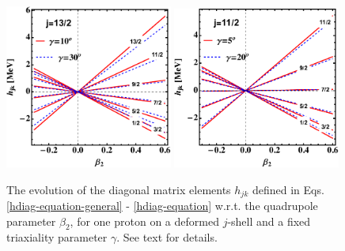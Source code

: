 \begin{figure}
    \centering
    \includegraphics[width=0.49\textwidth]{Chapters/Figures/singleParticle-hdiag-1.pdf}
    \includegraphics[width=0.49\textwidth]{Chapters/Figures/singleParticle-hdiag-2.pdf}
    \caption{The evolution of the diagonal matrix elements $h_{jk}$ defined in Eqs. \eqref{hdiag-equation-general} - \eqref{hdiag-equation} w.r.t. the quadrupole parameter $\beta_2$, for one proton on a deformed $j$-shell and a fixed triaxiality parameter $\gamma$. See text for details.}
    \label{hdiag-beta-evolution}
\end{figure}
